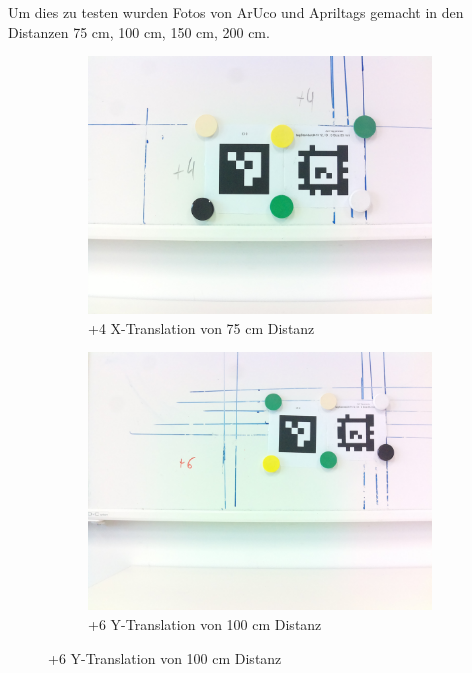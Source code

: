 Um dies zu testen wurden Fotos von ArUco und Apriltags gemacht in den Distanzen 75 cm, 100 cm, 150 cm, 200 cm.
\begin{figure}[H]
    \centering
    \begin{subfigure}[h]{0.45\textwidth}
        \centering
        \includegraphics[width=\linewidth]{graphics/75_xtranslate.jpg}
        \caption{+4 X-Translation von 75 cm Distanz}
        \label{fig:Test75}
    \end{subfigure}
    \begin{subfigure}[h]{0.45\textwidth}
        \centering
        \includegraphics[width=\linewidth]{graphics/100_ytranslate.jpg}
        \caption{+6 Y-Translation von 100 cm Distanz}
        \label{fig:Test100}

\end{subfigure}
\end{figure}
